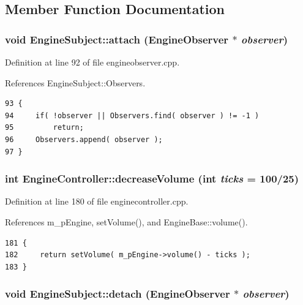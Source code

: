 \subsection{Member Function Documentation}
\subsubsection{\setlength{\rightskip}{0pt plus 5cm}void Engine\-Subject::attach ({\bf Engine\-Observer} $\ast$ {\em observer})\hspace{0.3cm}{\tt  [inherited]}}\label{classEngineSubject_EngineSubjecta0}




Definition at line 92 of file engineobserver.cpp.

References Engine\-Subject::Observers.



\footnotesize\begin{verbatim}93 {
94     if( !observer || Observers.find( observer ) != -1 )
95         return;
96     Observers.append( observer );
97 }
\end{verbatim}\normalsize 
{}
\subsubsection{\setlength{\rightskip}{0pt plus 5cm}int Engine\-Controller::decrease\-Volume (int {\em ticks} = 100/25)\hspace{0.3cm}{\tt  [slot]}}\label{classEngineController_EngineControlleri8}




Definition at line 180 of file enginecontroller.cpp.

References m\_\-p\-Engine, set\-Volume(), and Engine\-Base::volume().



\footnotesize\begin{verbatim}181 {
182     return setVolume( m_pEngine->volume() - ticks );
183 }
\end{verbatim}\normalsize 
{}
\subsubsection{\setlength{\rightskip}{0pt plus 5cm}void Engine\-Subject::detach ({\bf Engine\-Observer} $\ast$ {\em observer})\hspace{0.3cm}{\tt  [inherited]}}\label{classEngineSubject_EngineSubjecta1}





